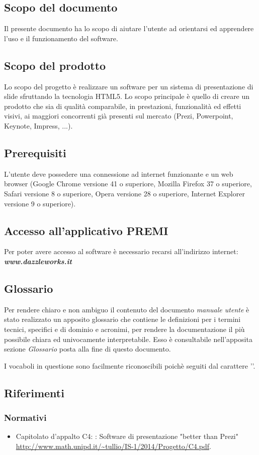 \subsection{Scopo del documento}
Il presente documento ha lo scopo di aiutare l'utente ad orientarsi ed apprendere l'uso e il funzionamento del software.

\subsection{Scopo del prodotto}
Lo scopo del progetto è realizzare un software per un sistema di presentazione di slide sfruttando la tecnologia HTML5. Lo scopo principale è quello di creare un prodotto che sia di qualità comparabile, in prestazioni, funzionalità ed effetti visivi, ai maggiori concorrenti già presenti sul mercato (Prezi, Powerpoint, Keynote, Impress, ...).

\subsection{Prerequisiti}
L'utente deve possedere una connessione ad internet funzionante e un web browser (Google Chrome versione 41 o superiore, Mozilla Firefox 37 o superiore, Safari versione 8 o superiore, Opera versione 28 o superiore, Internet Explorer versione 9 o superiore).

\subsection{Accesso all'applicativo PREMI}
Per poter avere accesso al software è necessario recarsi all'indirizzo internet: \textbf{\textit{www.dazzleworks.it}}

\subsection{Glossario}
Per rendere chiaro e non ambiguo il contenuto del documento \textit{manuale utente} è stato realizzato un apposito glossario che contiene le definizioni per i termini tecnici, specifici e di dominio e acronimi, per rendere la documentazione il più possibile chiara ed univocamente interpretabile. Esso è consultabile nell'apposita sezione \textit{Glossario} posta alla fine di questo documento.

\noindent I vocaboli in questione sono facilmente riconoscibili poichè seguiti dal carattere ''.

\subsection{Riferimenti}
\subsubsection{Normativi}

\begin{itemize}
	\item Capitolato d'appalto C4: \PROGETTO: Software di presentazione "better than Prezi" \\ \url{http://www.math.unipd.it/~tullio/IS-1/2014/Progetto/C4.pdf}.
\end{itemize}
